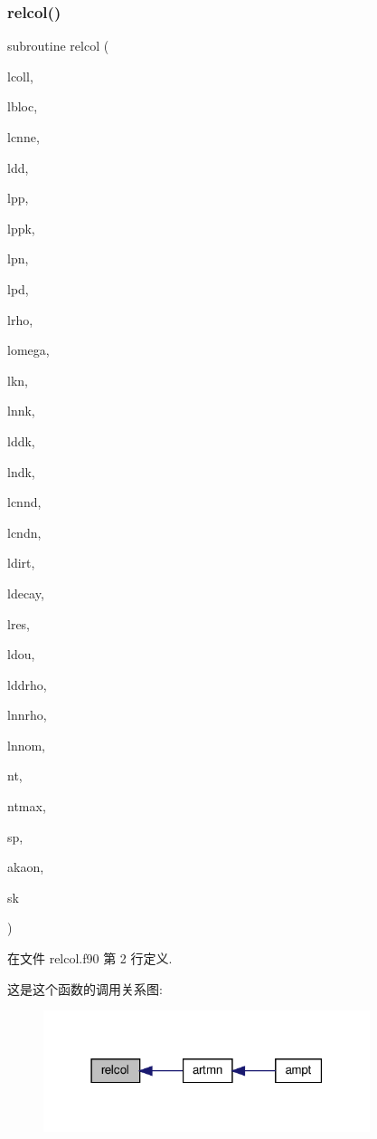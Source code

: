 \subsubsection{\texorpdfstring{relcol()}{relcol()}}
{\footnotesize\ttfamily subroutine relcol (\begin{DoxyParamCaption}\item[{}]{lcoll,  }\item[{}]{lbloc,  }\item[{}]{lcnne,  }\item[{}]{ldd,  }\item[{}]{lpp,  }\item[{}]{lppk,  }\item[{}]{lpn,  }\item[{}]{lpd,  }\item[{}]{lrho,  }\item[{}]{lomega,  }\item[{}]{lkn,  }\item[{}]{lnnk,  }\item[{}]{lddk,  }\item[{}]{lndk,  }\item[{}]{lcnnd,  }\item[{}]{lcndn,  }\item[{}]{ldirt,  }\item[{}]{ldecay,  }\item[{}]{lres,  }\item[{}]{ldou,  }\item[{}]{lddrho,  }\item[{}]{lnnrho,  }\item[{}]{lnnom,  }\item[{}]{nt,  }\item[{}]{ntmax,  }\item[{}]{sp,  }\item[{}]{akaon,  }\item[{}]{sk }\end{DoxyParamCaption})}



在文件 relcol.\+f90 第 2 行定义.

这是这个函数的调用关系图\+:
\nopagebreak
\begin{figure}[H]
\begin{center}
\leavevmode
\includegraphics[width=271pt]{relcol_8f90_acbace5cff9ef2f3a8fd2d831dc30c3ff_icgraph}
\end{center}
\end{figure}
